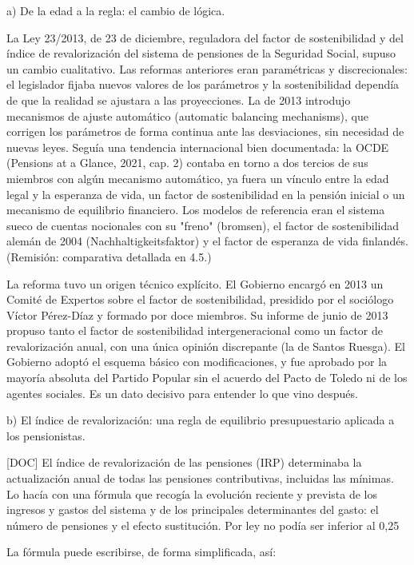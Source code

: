 \documentclass[10pt,a4paper]{article}
\begin{document}
a) De la edad a la regla: el cambio de lógica.

La Ley 23/2013, de 23 de diciembre, reguladora del factor de sostenibilidad y del índice de revalorización del sistema de pensiones de la Seguridad Social, supuso un cambio cualitativo. Las reformas anteriores eran paramétricas y discrecionales: el legislador fijaba nuevos valores de los parámetros y la sostenibilidad dependía de que la realidad se ajustara a las proyecciones. La de 2013 introdujo mecanismos de ajuste automático (automatic balancing mechanisms), que corrigen los parámetros de forma continua ante las desviaciones, sin necesidad de nuevas leyes. Seguía una tendencia internacional bien documentada: la OCDE (Pensions at a Glance, 2021, cap. 2) contaba en torno a dos tercios de sus miembros con algún mecanismo automático, ya fuera un vínculo entre la edad legal y la esperanza de vida, un factor de sostenibilidad en la pensión inicial o un mecanismo de equilibrio financiero. Los modelos de referencia eran el sistema sueco de cuentas nocionales con su "freno" (bromsen), el factor de sostenibilidad alemán de 2004 (Nachhaltigkeitsfaktor) y el factor de esperanza de vida finlandés. (Remisión: comparativa detallada en 4.5.)

La reforma tuvo un origen técnico explícito. El Gobierno encargó en 2013 un Comité de Expertos sobre el factor de sostenibilidad, presidido por el sociólogo Víctor Pérez-Díaz y formado por doce miembros. Su informe de junio de 2013 propuso tanto el factor de sostenibilidad intergeneracional como un factor de revalorización anual, con una única opinión discrepante (la de Santos Ruesga). El Gobierno adoptó el esquema básico con modificaciones, y fue aprobado por la mayoría absoluta del Partido Popular sin el acuerdo del Pacto de Toledo ni de los agentes sociales. Es un dato decisivo para entender lo que vino después.

b) El índice de revalorización: una regla de equilibrio presupuestario aplicada a los pensionistas.

[DOC] El índice de revalorización de las pensiones (IRP) determinaba la actualización anual de todas las pensiones contributivas, incluidas las mínimas. Lo hacía con una fórmula que recogía la evolución reciente y prevista de los ingresos y gastos del sistema y de los principales determinantes del gasto: el número de pensiones y el efecto sustitución. Por ley no podía ser inferior al 0,25%

La fórmula puede escribirse, de forma simplificada, así:
\end{document}
